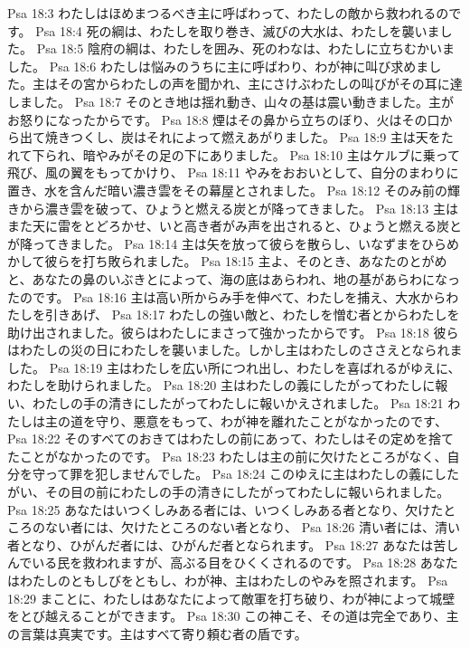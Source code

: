 Psa 18:3  わたしはほめまつるべき主に呼ばわって、わたしの敵から救われるのです。
Psa 18:4  死の綱は、わたしを取り巻き、滅びの大水は、わたしを襲いました。
Psa 18:5  陰府の綱は、わたしを囲み、死のわなは、わたしに立ちむかいました。
Psa 18:6  わたしは悩みのうちに主に呼ばわり、わが神に叫び求めました。主はその宮からわたしの声を聞かれ、主にさけぶわたしの叫びがその耳に達しました。
Psa 18:7  そのとき地は揺れ動き、山々の基は震い動きました。主がお怒りになったからです。
Psa 18:8  煙はその鼻から立ちのぼり、火はその口から出て焼きつくし、炭はそれによって燃えあがりました。
Psa 18:9  主は天をたれて下られ、暗やみがその足の下にありました。
Psa 18:10  主はケルブに乗って飛び、風の翼をもってかけり、
Psa 18:11  やみをおおいとして、自分のまわりに置き、水を含んだ暗い濃き雲をその幕屋とされました。
Psa 18:12  そのみ前の輝きから濃き雲を破って、ひょうと燃える炭とが降ってきました。
Psa 18:13  主はまた天に雷をとどろかせ、いと高き者がみ声を出されると、ひょうと燃える炭とが降ってきました。
Psa 18:14  主は矢を放って彼らを散らし、いなずまをひらめかして彼らを打ち敗られました。
Psa 18:15  主よ、そのとき、あなたのとがめと、あなたの鼻のいぶきとによって、海の底はあらわれ、地の基があらわになったのです。
Psa 18:16  主は高い所からみ手を伸べて、わたしを捕え、大水からわたしを引きあげ、
Psa 18:17  わたしの強い敵と、わたしを憎む者とからわたしを助け出されました。彼らはわたしにまさって強かったからです。
Psa 18:18  彼らはわたしの災の日にわたしを襲いました。しかし主はわたしのささえとなられました。
Psa 18:19  主はわたしを広い所につれ出し、わたしを喜ばれるがゆえに、わたしを助けられました。
Psa 18:20  主はわたしの義にしたがってわたしに報い、わたしの手の清きにしたがってわたしに報いかえされました。
Psa 18:21  わたしは主の道を守り、悪意をもって、わが神を離れたことがなかったのです、
Psa 18:22  そのすべてのおきてはわたしの前にあって、わたしはその定めを捨てたことがなかったのです。
Psa 18:23  わたしは主の前に欠けたところがなく、自分を守って罪を犯しませんでした。
Psa 18:24  このゆえに主はわたしの義にしたがい、その目の前にわたしの手の清きにしたがってわたしに報いられました。
Psa 18:25  あなたはいつくしみある者には、いつくしみある者となり、欠けたところのない者には、欠けたところのない者となり、
Psa 18:26  清い者には、清い者となり、ひがんだ者には、ひがんだ者となられます。
Psa 18:27  あなたは苦しんでいる民を救われますが、高ぶる目をひくくされるのです。
Psa 18:28  あなたはわたしのともしびをともし、わが神、主はわたしのやみを照されます。
Psa 18:29  まことに、わたしはあなたによって敵軍を打ち破り、わが神によって城壁をとび越えることができます。
Psa 18:30  この神こそ、その道は完全であり、主の言葉は真実です。主はすべて寄り頼む者の盾です。
